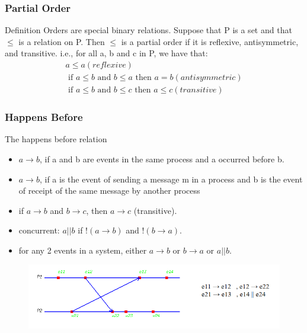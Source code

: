 \begin{frame}
    \frametitle{Partial Order}
    \begin{block}{Definition}
        Orders are special binary relations. Suppose that P is a set and that $\le$ is a relation on P. Then $\le$ is a \alert{partial order} if it is \alert{reflexive}, \alert{antisymmetric}, and \alert{transitive}. i.e., for all a, b and c in P, we have that: \\
        \begin{gather}
            a \le a (reflexive) \\
            \mbox{ if } a \le b \mbox{ and } b \le a \mbox{ then } a = b (antisymmetric) \\
            \mbox{ if } a \le b \mbox{ and } b \le c \mbox{ then } a \le c (transitive)
        \end{gather}
    \end{block}
\end{frame}

\begin{frame}
    \frametitle{Happens Before}
    \begin{block}{The happens before \to relation}
        \begin{itemize}
            \item $a \to b$, if a and b are events in the same process and a occurred before b.
            \item $a \to b$, if a is the event of sending a message m in a process and b is the event of receipt of the same message by another process
            \item if $a \to b$ and $b \to c$, then $a \to c$ (transitive).
            \item concurrent: $ a || b$ if $!(a \to b)$ and $!(b \to a)$.
            \item for any 2 events in a system, either $a \to b$ or $b \to a$ or $a || b$.
        \end{itemize}
    \end{block}
    \begin{figure}
        \centering
        \includegraphics[scale=0.28]{./figures/lamport.png}
    \end{figure}
\end{frame}

